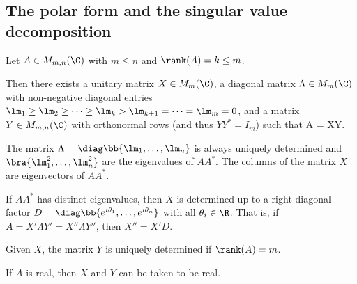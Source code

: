 \subsection{The polar form and the singular value decomposition}

\begin{lemma}\label{lem:any_matrix_product_of_unitary_diagonal_orthonormal}
Let $A\in M_{m,n}(\C)$ with $m\leq n$ and $\rank (A) = k\leq m$.

Then there exists a unitary matrix $X\in M_m(\C)$, a diagonal matrix $\Lambda \in M_m(\C)$ with non-negative diagonal entries $\lm_1 \geq \lm_2 \geq \dots \geq \lm_k > \lm_{k+1} = \dots = \lm_m =
0$, and a matrix $Y\in M_{m,n}(\C)$ with orthonormal rows (and thus $YY^* = I_m$) such that
\be
A = X\Lambda Y.
\ee

The matrix $\Lambda = \diag\bb{\lm_1,\dots,\lm_n}$ is always uniquely determined and $\bra{\lm_1^2,\dots,\lm_n^2}$ are the eigenvalues of $AA^*$. The columns of the matrix $X$ are eigenvectors of
$AA^*$.

If $AA^*$ has distinct eigenvalues, then $X$ is determined up to a right diagonal factor $D = \diag\bb{e^{i\theta_1},\dots,e^{i\theta_n}}$ with all $\theta_i\in \R$. That is, if $A = X'\Lambda Y' =
X''\Lambda Y''$, then $X'' = X'D$.

Given $X$, the matrix $Y$ is uniquely determined if $\rank(A) = m$.

If $A$ is real, then $X$ and $Y$ can be taken to be real.
\end{lemma}

